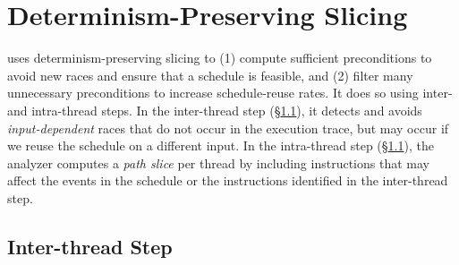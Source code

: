\section{Determinism-Preserving Slicing} \label{sec:slice}

\peregrine uses determinism-preserving slicing to (1) compute sufficient
preconditions to avoid new races and ensure that a schedule is feasible,
and (2) filter many unnecessary preconditions to increase schedule-reuse
rates.  It does so using inter- and intra-thread steps.  In the
inter-thread step (\S\ref{sec:interthread-slice}), it detects and avoids
\emph{input-dependent} races that do not occur in the execution trace, but
may occur if we reuse the schedule on a different input.
In the intra-thread step (\S\ref{sec:interthread-slice}), the analyzer
computes a \emph{path slice} per thread by including instructions that may
affect the events in the schedule or the instructions identified in the
inter-thread step.





\subsection{Inter-thread Step} \label{sec:interthread-slice}

